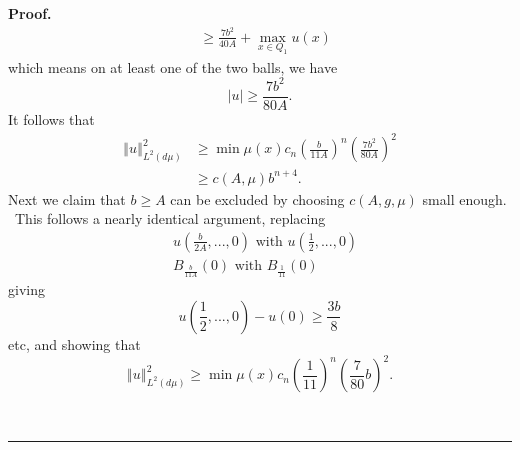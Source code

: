 \documentclass[10pt,a4paper]{amsart}
\newenvironment{proof}[1][Proof]{\noindent\textbf{#1.} }{\ \rule{0.5em}{0.5em}}
\begin{document}
\begin{proof}
\begin{align*}
&  \geq\frac{7b^{2}}{40A}+\max_{x\in Q_{1}}u(x)
\end{align*}
which means on at least one of the two balls, we have
\[
\left\vert u\right\vert \geq\frac{7b^{2}}{80A}.
\]
It follows that
\begin{align*}
\left\Vert u\right\Vert _{L^{2}(d\mu)}^{2}  &  \geq\min\mu(x)c_{n}\left(
\frac{b}{11A}\right)  ^{n}\left(  \frac{7b^{2}}{80A}\right)  ^{2}\\
&  \geq c(A,\mu)b^{n+4}.
\end{align*}
Next we claim that $b\geq A$ can be excluded by choosing $c(A,g,\mu)$ small
enough. \ This follows a nearly identical argument, replacing
\begin{align*}
&  u(\frac{b}{2A},...,0)\text{ with }u(\frac{1}{2},...,0)\\
&  B_{\frac{b}{11A}}(0)\text{ with }B_{\frac{1}{11}}(0)
\end{align*}
giving%
\[
u(\frac{1}{2},...,0)-u(0)\geq\frac{3b}{8}%
\]
etc, and showing that
\[
\left\Vert u\right\Vert _{L^{2}(d\mu)}^{2}\geq\min\mu(x)c_{n}\left(  \frac
{1}{11}\right)  ^{n}\left(  \frac{7}{80}b\right)  ^{2}.
\]

\end{proof}
\end{document}
